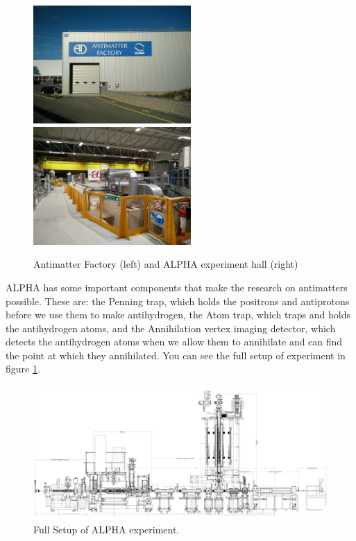 \documentclass[12pt,a4paper]{article}
\begin{document}
\begin{figure}[h]

\includegraphics[width=60mm]{antimatter_factory}
\hspace{10mm}
\includegraphics[width=60mm]{alpha_hall}

\caption{Antimatter Factory (left) and ALPHA experiment hall (right)}
\end{figure}

ALPHA has some important components that make the research on antimatters possible. These are: the Penning trap, which holds the positrons and antiprotons before we use them to make antihydrogen, the Atom trap, which traps and holds the antihydrogen atoms, and the Annihilation vertex imaging detector, which detects the antihydrogen atoms when we allow them to annihilate and can find the point at which they annihilated. You can see the full setup of experiment in figure \ref{fig:full_map}.

\begin{figure}[h]
\centering
\includegraphics[scale=0.09]{full_map}
\caption{Full Setup of ALPHA experiment.}
\label{fig:full_map}
\end{figure}
\end{document}
